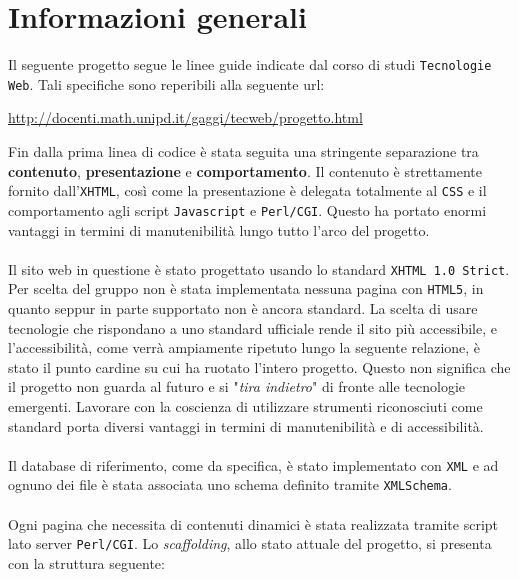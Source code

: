 \section{Informazioni generali}

Il seguente progetto segue le linee guide indicate dal corso di studi \texttt{Tecnologie Web}. Tali specifiche sono reperibili alla seguente url:

\begin{center}
	\url{http://docenti.math.unipd.it/gaggi/tecweb/progetto.html}
\end{center}
Fin dalla prima linea di codice è stata seguita una stringente separazione tra \textbf{contenuto}, \textbf{presentazione} e \textbf{comportamento}. Il contenuto è strettamente fornito dall'\texttt{XHTML}, così come la presentazione è delegata totalmente al \texttt{CSS} e il comportamento agli script \texttt{Javascript} e \texttt{Perl/CGI}. Questo ha portato enormi vantaggi in termini di manutenibilità lungo tutto l'arco del progetto. \\ \\
Il sito web in questione è stato progettato usando lo standard \texttt{XHTML 1.0 Strict}. Per scelta del gruppo non è stata implementata nessuna pagina con \texttt{HTML5}, in quanto seppur in parte supportato non è ancora standard. La scelta di usare tecnologie che rispondano a uno standard ufficiale rende il sito più accessibile, e l'accessibilità, come verrà ampiamente ripetuto lungo la seguente relazione, è stato il punto cardine su cui ha ruotato l'intero progetto. Questo non significa che il progetto non guarda al futuro e si "\textit{tira indietro}" di fronte alle tecnologie emergenti. Lavorare con la coscienza di utilizzare strumenti riconosciuti come standard porta diversi vantaggi in termini di manutenibilità e di accessibilità. \\ \\
Il database di riferimento, come da specifica, è stato implementato con \texttt{XML} e ad ognuno dei file è stata associata uno schema definito tramite \texttt{XMLSchema}. \\ \\
Ogni pagina che necessita di contenuti dinamici è stata realizzata tramite script lato server \texttt{Perl/CGI}.
Lo \textit{scaffolding}, allo stato attuale del progetto, si presenta con la struttura seguente:

